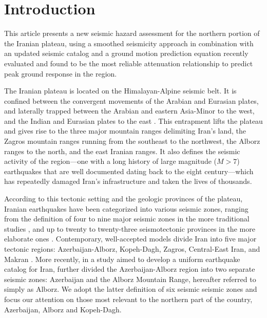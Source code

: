 
\section{Introduction}

This article presents a new seismic hazard assessment for the northern portion of the Iranian plateau, using a smoothed seismicity approach in combination with an updated seismic catalog and a ground motion prediction equation recently evaluated and found to be the most reliable attenuation relationship to predict peak ground response in the region. 

The Iranian plateau is located on the Himalayan-Alpine seismic belt. It is confined between the convergent movements of the Arabian and Eurasian plates, and laterally trapped between the Arabian and eastern Asia-Minor to the west, and the Indian and Eurasian plates to the east \citep{Berberian_1981_Chap}. This entrapment lifts the plateau and gives rise to the three major mountain ranges delimiting Iran's land, the Zagros mountain ranges running from the southeast to the northwest, the Alborz ranges to the north, and the east Iranian ranges. It also defines the seismic activity of the region---one with a long history of large magnitude ($M>7$) earthquakes that are well documented dating back to the eight century---which has repeatedly damaged Iran's infrastructure and taken the lives of thousands. 

According to this tectonic setting and the geologic provinces of the plateau, Iranian earthquakes have been categorized into various seismic zones, ranging from the definition of four to nine major seismic zones in the more traditional studies \citep[e.g.,][]{Stocklin1968, Takin1972, Berberian1976}, and up to twenty to twenty-three seismotectonic provinces in the more elaborate ones \citep[e.g.,][]{Nowroozi1976, Tavakoli1999}. Contemporary, well-accepted models divide Iran into five major tectonic regions: Azerbaijan-Alborz, Kopeh-Dagh, Zagros, Central-East Iran, and Makran \citep[e.g.,][]{Mirzaei1998}. More recently, in a study aimed to develop a uniform earthquake catalog for Iran, \citet{Karimiparidari2013} further divided the Azerbaijan-Alborz region into two separate seismic zones: Azerbaijan and the Alborz Mountain Range, hereafter referred to simply as Alborz. We adopt the latter definition of six seismic seismic zones and focus our attention on those most relevant to the northern part of the country, Azerbaijan, Alborz and Kopeh-Dagh.

